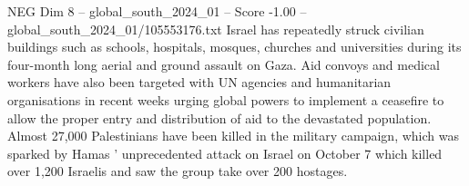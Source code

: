 \begin{textsample}{NEG Dim 8 – global\_south\_2024\_01 – Score -1.00 – global\_south\_2024\_01/105553176.txt}
Israel has repeatedly struck civilian buildings such as schools, hospitals, mosques, churches and universities during its four-month long aerial and ground assault on Gaza.
Aid convoys and medical workers have also been targeted with UN agencies and humanitarian organisations in recent weeks urging global powers to implement a ceasefire to allow the proper entry and distribution of aid to the devastated population.
Almost 27,000 Palestinians have been killed in the military campaign, which was sparked by Hamas ' unprecedented attack on Israel on October 7 which killed over 1,200 Israelis and saw the group take over 200 hostages.

\end{textsample}
